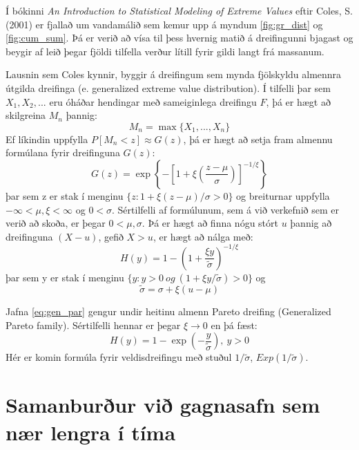 \documentclass[10pt,a4paper,titlepage,twoside]{article}
\newcommand\given[1][]{\:#1\vert\:}
\newcommand{\note}[1]{\textcolor{ymagray}{\textbf{[#1]}}}
\begin{document}
Í bókinni \textit{An Introduction to Statistical Modeling of Extreme Values} eftir Coles, S. (2001) er fjallað um vandamálið sem kemur upp á myndum \ref{fig:gr_dist} og \ref{fig:cum_sum}. Þá er verið að vísa til þess hvernig matið á dreifingunni bjagast og beygir af leið þegar fjöldi tilfella verður lítill fyrir gildi langt frá massanum.


Lausnin sem Coles kynnir, byggir á dreifingum sem mynda fjölskyldu almennra útgilda dreifinga (e. generalized extreme value distribution). Í tilfelli þar sem $X_1,X_2,...$ eru óháðar hendingar með sameiginlega dreifingu $F$, þá er hægt að skilgreina $M_n$ þannig:
\[
M_n = \max\{X_1,...,X_n\}
\]
Ef líkindin uppfylla $P[M_n<z]\approx G(z)$, þá er hægt að setja fram almennu formúlana fyrir dreifinguna $G(z)$:
\[
G(z) = \exp \left\lbrace -\left[ 1+ \xi \left( \frac{z-\mu}{\sigma} \right) \right]^{-1/\xi} \right\rbrace
\]
þar sem z er stak í menginu $\{z : 1 + \xi (z-\mu)/ \sigma > 0\}$ og breiturnar uppfylla $-\infty < \mu,\xi < \infty$ og $0<\sigma$. Sértilfelli af formúlunum, sem á við verkefnið sem er verið að skoða, er þegar $0<\mu,\sigma$. Þá er hægt að finna nógu stórt $u$ þannig að dreifinguna $(X-u)$, gefið $X>u$, er hægt að nálga með:
\begin{equation}\label{eq:gen_par}
H(y) = 1 - \left( 1 + \frac{\xi y}{\tilde{\sigma}} \right) ^{-1/\xi}
\end{equation}
þar sem y er stak í menginu $\{y : y>0 ~og~ (1 + \xi y/ \tilde{\sigma}) > 0\}$ og
\begin{equation}\label{eq:sigma}
\tilde{\sigma} = \sigma + \xi(u-\mu)
\end{equation}

Jafna \ref{eq:gen_par} gengur undir heitinu almenn Pareto dreifing (Generalized Pareto family). Sértilfelli hennar er þegar $\xi\rightarrow0$ en þá fæst:
\[
H(y) = 1 - \exp\left(-\frac{y}{\tilde{\sigma}} \right),~ y>0
\]
Hér er komin formúla fyrir veldisdreifingu með stuðul $1/\tilde{\sigma}$, $Exp(1/\tilde{\sigma})$.




\clearpage
\section{Samanburður við gagnasafn sem nær lengra í tíma}
\end{document}

